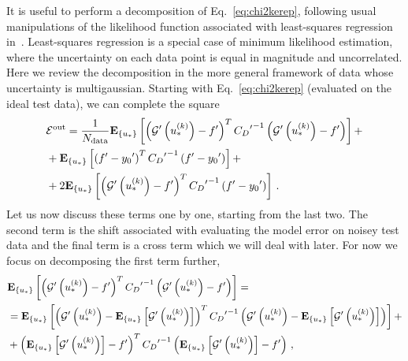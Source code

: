 It is useful to perform a decomposition of Eq.~\ref{eq:chi2kerep}, following
usual manipulations of the likelihood function associated with least-squares
regression in~\cite{mlforphysics}. Least-squares regression is a special case of
minimum likelihood estimation, where the uncertainty on each data point is equal
in magnitude and uncorrelated. Here we review the decomposition in the more
general framework of data whose uncertainty is multigaussian. Starting with
Eq.~\ref{eq:chi2kerep} (evaluated on the ideal test data), we can complete the
square
\begin{equation}
    \begin{split}
    \label{eq:EoutDecomposition}
        &\mathcal{E}^{\rm out} = \frac{1}{N_{\rm data}} \mathbf{E}_{\{ u_* \}} \left[ 
            \left( {{\mathcal{G}}^{\prime}}\left(u_*^{(k)}\right) - {{f}^{\prime}} \right)^T
            {{C_{D}}^{\prime}}^{-1}
            \left( {{\mathcal{G}}^{\prime}}\left(u_*^{(k)}\right) - {{f}^{\prime}} \right)
         \right] + \\
        &+ \mathbf{E}_{\{ u_* \}} \left[ 
            \left( {{f}^{\prime}} - {{y_0}^{\prime}} \right)^T
            {{C_{D}}^{\prime}}^{-1}
            \left( {{f}^{\prime}} - {{y_0}^{\prime}} \right)
         \right]+ \\
        &+ 2 \mathbf{E}_{\{ u_* \}} \left[ 
            \left( {{\mathcal{G}}^{\prime}}\left(u_*^{(k)}\right) - {{f}^{\prime}} \right)^T
            {{C_{D}}^{\prime}}^{-1}
            \left({{f}^{\prime}} - {{y_0}^{\prime}} \right)
         \right]\, .
    \end{split}
\end{equation}
Let us now discuss these terms one by one, starting from the last two. The
second term is the shift associated with evaluating the model error on noisey
test data and the final term is a cross term which we will deal with later. For
now we focus on decomposing the first term further,
\begin{equation}
    \begin{split}
        &\mathbf{E}_{\{ u_* \}} \left[ 
            \left( {{\mathcal{G}}^{\prime}}\left(u_*^{(k)}\right) - {{f}^{\prime}} \right)^T
            {{C_{D}}^{\prime}}^{-1}
            \left( {{\mathcal{G}}^{\prime}}\left(u_*^{(k)}\right) - {{f}^{\prime}} \right)
         \right] = \\
        &= \mathbf{E}_{\{ u_* \}} \left[ 
            \left( {{\mathcal{G}}^{\prime}}\left(u_*^{(k)}\right) - 
            \mathbf{E}_{\{ u_* \}} \left[ {{\mathcal{G}}^{\prime}}\left(u_*^{(k)}\right) \right] \right)^T
            {{C_{D}}^{\prime}}^{-1}
            \left( {{\mathcal{G}}^{\prime}}\left(u_*^{(k)}\right) - 
            \mathbf{E}_{\{ u_* \}} \left[ {{\mathcal{G}}^{\prime}}\left(u_*^{(k)}\right) \right] \right)
         \right] + \\
        &+ \left( \mathbf{E}_{\{ u_* \}} \left[ {{\mathcal{G}}^{\prime}}\left(u_*^{(k)}\right) \right] - {{f}^{\prime}} \right)^T
        {{C_{D}}^{\prime}}^{-1}
        \left( \mathbf{E}_{\{ u_* \}} \left[ {{\mathcal{G}}^{\prime}}\left(u_*^{(k)}\right) \right] - {{f}^{\prime}} \right)\, ,
    \end{split}
\end{equation}
